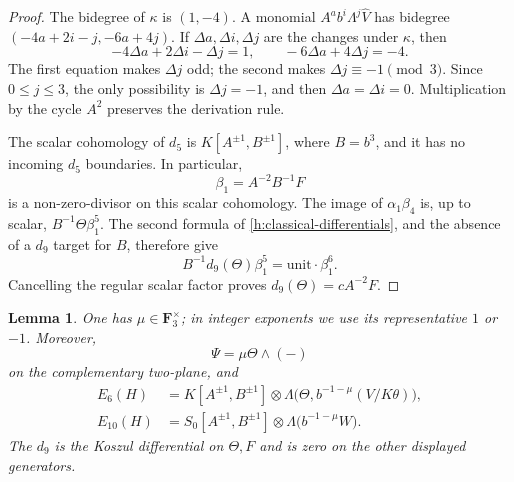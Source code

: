 \documentclass[11pt]{article}
\newtheorem{lemma}[theorem]{Lemma}
\theoremstyle{definition}
\theoremstyle{remark}
\numberwithin{equation}{section}
\begin{document}
\begin{proof}
The bidegree of $\kappa$ is $(1,-4)$. A monomial
$A^a b^i\Lambda^j\widehat V$ has bidegree
$(-4a+2i-j,-6a+4j)$. If $\Delta a,\Delta i,\Delta j$ are the changes
under $\kappa$, then
\[
 -4\Delta a+2\Delta i-\Delta j=1,
 \qquad -6\Delta a+4\Delta j=-4.
\]
The first equation makes $\Delta j$ odd; the second makes
$\Delta j\equiv-1\pmod3$. Since $0\leq j\leq3$, the only
possibility is $\Delta j=-1$, and then
$\Delta a=\Delta i=0$. Multiplication by the cycle $A^2$ preserves
the derivation rule.

The scalar cohomology of $d_5$ is
$K[A^{\pm1},B^{\pm1}]$, where $B=b^3$, and it has no incoming
$d_5$ boundaries. In particular,
\[
 \beta_1=A^{-2}B^{-1}F
\]
is a non-zero-divisor on this scalar cohomology. The image of
$\alpha_1\beta_4$ is, up to scalar,
$B^{-1}\Theta\beta_1^5$. The second formula of
\eqref{h:classical-differentials}, and the absence of a $d_9$ target
for $B$, therefore give
\[
 B^{-1}d_9(\Theta)\beta_1^5
   =\text{unit}\cdot\beta_1^6.
\]
Cancelling the regular scalar factor proves
$d_9(\Theta)=cA^{-2}F$.
\end{proof}

\begin{lemma}
 \label{h:mu-and-matrix}
 One has $\mu\in\mathbf F_3^{\times}$; in integer exponents we use its
 representative $1$ or $-1$. Moreover,
 \[
 \Psi=\mu\Theta\wedge(-)
 \]
 on the complementary two-plane, and
 \begin{align}
 \label{h:e6}
 E_6(H)&=K[A^{\pm1},B^{\pm1}]
       \otimes\Lambda\bigl(\Theta,b^{-1-\mu}(V/K\theta)\bigr),\\
 \label{h:e10}
 E_{10}(H)&=S_0[A^{\pm1},B^{\pm1}]
       \otimes\Lambda\bigl(b^{-1-\mu}W\bigr).
 \end{align}
 The $d_9$ is the Koszul differential on $\Theta,F$ and is zero on the
 other displayed generators.
\end{lemma}
\end{document}
